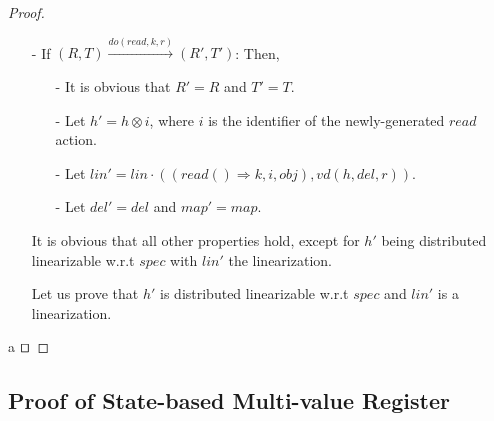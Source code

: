 \begin {proof}
\begin{itemize}
    From the construction of $\mathit{ds}$, it is easy to see that $\mathit{ds}(i) = R(r)[r:R(r)+1]$. Then, it is easy to see that $R'(r) = \mathit{merge}(R(r),\mathit{ds}(i))$. 
    
\item[-] If $(R,T) {\xrightarrow{\mathit{do}(\mathit{read},k,r)}} (R',T')$: Then,

    \begin{itemize}
    \setlength{\itemsep}{0.5pt}
    \item[-] It is obvious that $R' = R$ and $T' = T$.

    \item[-] Let $h' = h \otimes i$, where $i$ is the identifier of the newly-generated $\mathit{read}$ action.

    \item[-] Let $\mathit{lin}' = \mathit{lin} \cdot ((\mathit{read}() \Rightarrow k,i,\mathit{obj}), \mathit{vd}(h,\mathit{del},r) )$. 

    \item[-] Let $\mathit{del}' = \mathit{del}$ and $\mathit{map}' = \mathit{map}$.
    \end{itemize} 
    
    It is obvious that all other properties hold, except for $h'$ being distributed linearizable w.r.t $\mathit{spec}$ with $\mathit{lin}'$ the linearization. 
    
    Let us prove that $h'$ is distributed linearizable w.r.t $\mathit{spec}$ and $\mathit{lin}'$ is a linearization. 
\end{itemize}
a
$\qed$
\end {proof}




\subsection{Proof of State-based Multi-value Register}
\label{subsec:appendix proof of state-based multi-value register}
